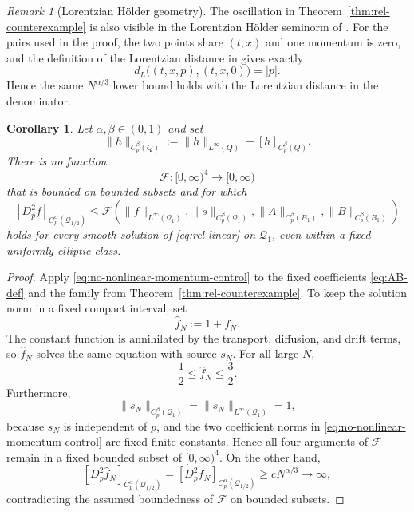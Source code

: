 \documentclass[11pt,reqno]{amsart}
\numberwithin{equation}{section}
\newtheorem{corollary}[theorem]{Corollary}
\theoremstyle{remark}
\newtheorem{remark}[theorem]{Remark}
\begin{document}
\begin{remark}[Lorentzian H\"older geometry]\label{rem:lorentz}
The oscillation in Theorem~\ref{thm:rel-counterexample} is also visible in the Lorentzian H\"older seminorm of \cite{HSTT}.  For the pairs used in the proof, the two points share $(t,x)$ and one momentum is zero, and the definition of the Lorentzian distance in \cite[(5.6)]{HSTT} gives exactly
\[
   d_L\bigl((t,x,p),(t,x,0)\bigr)=|p|.
\]
Hence the same $N^{\alpha/3}$ lower bound holds with the Lorentzian distance in the denominator.
\end{remark}

\begin{corollary}\label{cor:no-momentum-only-nonlinear-control}
Let $\alpha,\beta\in(0,1)$ and set
\[
   \|h\|_{C_p^\beta(Q)}:=\|h\|_{L^\infty(Q)}+[h]_{C_p^\beta(Q)}.
\]
There is no function
\[
   \mathcal F:[0,\infty)^4\longrightarrow[0,\infty)
\]
that is bounded on bounded subsets and for which
\begin{equation}\label{eq:no-nonlinear-momentum-control}
   [D_p^2f]_{C_p^\alpha(\mathcal Q_{1/2})}
   \le
   \mathcal F\!\left(
      \|f\|_{L^\infty(\mathcal Q_1)},
      \|s\|_{C_p^\beta(\mathcal Q_1)},
      \|A\|_{C_p^\beta(B_1)},
      \|B\|_{C_p^\beta(B_1)}
   \right)
\end{equation}
holds for every smooth solution of \eqref{eq:rel-linear} on $\mathcal Q_1$, even within a fixed uniformly elliptic class.
\end{corollary}

\begin{proof}
Apply \eqref{eq:no-nonlinear-momentum-control} to the fixed coefficients
\eqref{eq:AB-def} and the family from Theorem~\ref{thm:rel-counterexample}.
To keep the solution norm in a fixed compact interval, set
\[
   \widehat f_N:=1+f_N.
\]
The constant function is annihilated by the transport, diffusion, and drift
terms, so $\widehat f_N$ solves the same equation with source $s_N$.  For all
large $N$,
\[
   \frac12\le \widehat f_N\le\frac32.
\]
Furthermore,
\[
   \|s_N\|_{C_p^\beta(\mathcal Q_1)}
   =\|s_N\|_{L^\infty(\mathcal Q_1)}=1,
\]
because $s_N$ is independent of $p$, and the two coefficient norms in
\eqref{eq:no-nonlinear-momentum-control} are fixed finite constants.  Hence all
four arguments of $\mathcal F$ remain in a fixed bounded subset of
$[0,\infty)^4$.  On the other hand,
\[
   [D_p^2\widehat f_N]_{C_p^\alpha(\mathcal Q_{1/2})}
   =[D_p^2f_N]_{C_p^\alpha(\mathcal Q_{1/2})}
   \ge cN^{\alpha/3}\longrightarrow\infty,
\]
contradicting the assumed boundedness of $\mathcal F$ on bounded subsets.
\end{proof}
\end{document}

